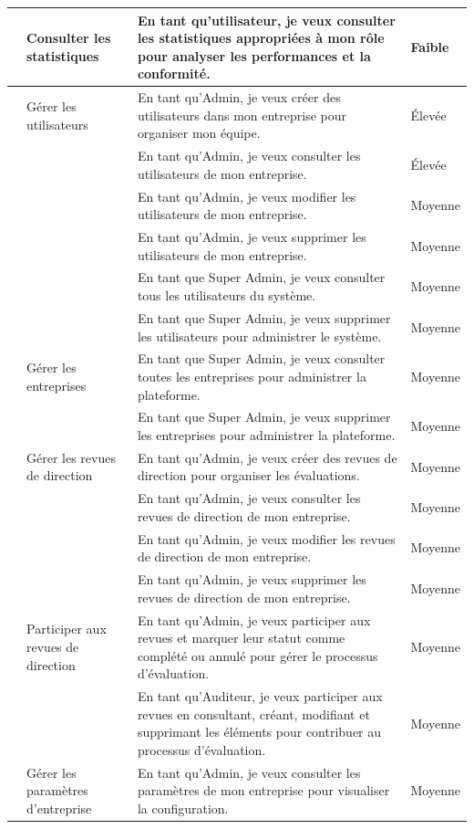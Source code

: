 \begin{longtable}{|>{\raggedright\arraybackslash}p{0.5cm}|>{\raggedright\arraybackslash}p{3cm}|>{\raggedright\arraybackslash}p{8cm}|>{\raggedright\arraybackslash}p{2cm}|}
\hline
7 & Consulter les statistiques & En tant qu'utilisateur, je veux consulter les statistiques appropriées à mon rôle pour analyser les performances et la conformité. & Faible \\
\hline
8 & Gérer les utilisateurs & En tant qu'Admin, je veux créer des utilisateurs dans mon entreprise pour organiser mon équipe. & Élevée \\
\cline{3-4}
& & En tant qu'Admin, je veux consulter les utilisateurs de mon entreprise. & Élevée \\
\cline{3-4}
& & En tant qu'Admin, je veux modifier les utilisateurs de mon entreprise. & Moyenne \\
\cline{3-4}
& & En tant qu'Admin, je veux supprimer les utilisateurs de mon entreprise. & Moyenne \\
\cline{3-4}
& & En tant que Super Admin, je veux consulter tous les utilisateurs du système. & Moyenne \\
\cline{3-4}
& & En tant que Super Admin, je veux supprimer les utilisateurs pour administrer le système. & Moyenne \\
\hline
9 & Gérer les entreprises & En tant que Super Admin, je veux consulter toutes les entreprises pour administrer la plateforme. & Moyenne \\
\cline{3-4}
& & En tant que Super Admin, je veux supprimer les entreprises pour administrer la plateforme. & Moyenne \\
\hline
10 & Gérer les revues de direction & En tant qu'Admin, je veux créer des revues de direction pour organiser les évaluations. & Moyenne \\
\cline{3-4}
& & En tant qu'Admin, je veux consulter les revues de direction de mon entreprise. & Moyenne \\
\cline{3-4}
& & En tant qu'Admin, je veux modifier les revues de direction de mon entreprise. & Moyenne \\
\cline{3-4}
& & En tant qu'Admin, je veux supprimer les revues de direction de mon entreprise. & Moyenne \\
\hline
11 & Participer aux revues de direction & En tant qu'Admin, je veux participer aux revues et marquer leur statut comme complété ou annulé pour gérer le processus d'évaluation. & Moyenne \\
\cline{3-4}
& & En tant qu'Auditeur, je veux participer aux revues en consultant, créant, modifiant et supprimant les éléments pour contribuer au processus d'évaluation. & Moyenne \\
\hline
12 & Gérer les paramètres d'entreprise & En tant qu'Admin, je veux consulter les paramètres de mon entreprise pour visualiser la configuration. & Moyenne \\

\end{longtable}

